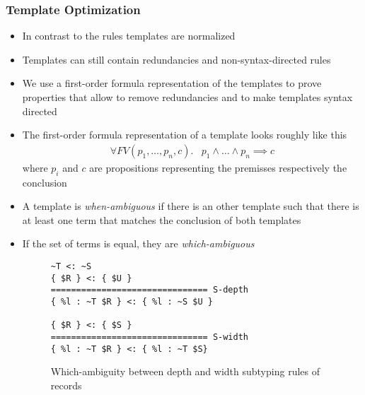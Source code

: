 \documentclass{beamer}
\begin{document}
\begin{frame}
  \frametitle{Template Optimization}
  \begin{itemize}
  \item In contrast to the rules templates are normalized
  \item Templates can still contain redundancies and
    non-syntax-directed rules
  \item We use a first-order formula representation of the templates
    to prove properties that allow to remove redundancies and to make
    templates syntax directed
  \item The first-order formula representation of a template looks
    roughly like this
    \begin{align}
      \forall FV(p_1,\dots, p_n, c) .& p_1 \land \dots \land p_n
      \implies c
    \end{align}
    where $p_i$ and $c$ are propositions representing the premisses
    respectively the conclusion
  \end{itemize}

\framebreak{}

  \begin{itemize}
  \item A template is \textit{when-ambiguous} if there is an other
    template such that there is at least one term that matches the
    conclusion of both templates
  \item If the set of terms is equal, they are \textit{which-ambiguous}
\begin{figure}
\begin{lstlisting}
~T <: ~S
{ $R } <: { $U }
=============================== S-depth
{ %l : ~T $R } <: { %l : ~S $U }

{ $R } <: { $S }
=============================== S-width
{ %l : ~T $R } <: { %l : ~T $S}
\end{lstlisting}
\caption{Which-ambiguity between depth and width subtyping rules of records}
\end{figure}
\end{itemize}

\framebreak{}


\end{frame}
\end{document}
